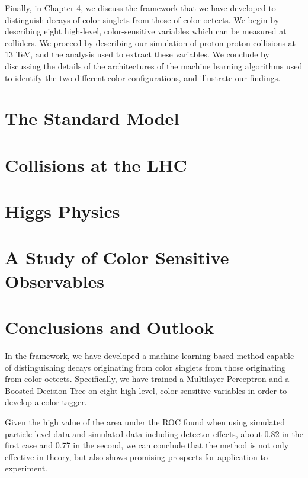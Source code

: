 \documentclass[10pt,a4paper]{book}
\begin{document}
Finally, in Chapter 4, we discuss the framework that we have developed to distinguish decays of color singlets from those of color octects. We begin by describing eight high-level, color-sensitive variables which can be measured at colliders. We proceed by describing our simulation of proton-proton collisions at 13 TeV, and the analysis used to extract these variables. We conclude by discussing the details of the architectures of the machine learning algorithms used to identify the two different color configurations, and illustrate our findings.

\chapter{The Standard Model}


\chapter{Collisions at the LHC}


\chapter{Higgs Physics}


\chapter{A Study of Color Sensitive Observables}


\chapter*{Conclusions and Outlook}

In the framework, we have developed a machine learning based method capable of distinguishing decays originating from color singlets from those originating from color octects. Specifically, we have trained a Multilayer Perceptron and a Boosted Decision Tree on eight high-level, color-sensitive variables in order to develop a color tagger.

Given the high value of the area under the ROC found when using simulated particle-level data and simulated data including detector effects, about 0.82 in the first case and 0.77 in the second, we can conclude that the method is not only effective in theory, but also shows promising prospects for application to experiment. 
\end{document}
